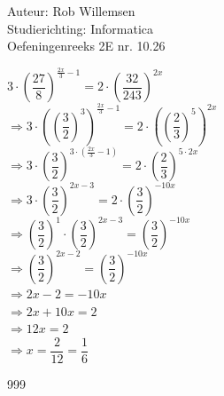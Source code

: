 \documentclass[a4paper]{article}
\begin{document}
\noindent \large Auteur: Rob Willemsen \\
\noindent \large Studierichting: Informatica\\
\noindent \large Oefeningenreeks 2E nr. 10.26\\

\medskip

\normalsize

$3 \cdot \left(\dfrac{27}{8}\right)^{\tfrac{2x}{3}-1} = 2 \cdot \left(\dfrac{32}{243}\right)^{2x}$ \\

$\Rightarrow 3 \cdot \left(\left(\dfrac{3}{2}\right)^3\right)^{\tfrac{2x}{3}-1} = 2 \cdot \left(\left(\dfrac{2}{3}\right)^5\right)^{2x}$\\

$\Rightarrow 3 \cdot \left(\dfrac{3}{2}\right)^{3 \cdot \left(\tfrac{2x}{3}-1\right)} = 2 \cdot \left(\dfrac{2}{3}\right)^{5 \cdot 2x}$\\

$\Rightarrow 3 \cdot \left(\dfrac{3}{2}\right)^{2x-3} = 2 \cdot \left(\dfrac{3}{2}\right)^{-10x}$\\

$\Rightarrow \left(\dfrac{3}{2}\right)^1 \cdot \left(\dfrac{3}{2}\right)^{2x-3} = \left(\dfrac{3}{2}\right)^{-10x}$\\

$\Rightarrow \left(\dfrac{3}{2}\right)^{2x-2} = \left(\dfrac{3}{2}\right)^{-10x}$\\

$\Rightarrow 2x - 2 = -10x$\\

$\Rightarrow 2x + 10x = 2$\\

$\Rightarrow 12x = 2$\\

$\Rightarrow x = \dfrac{2}{12} = \dfrac{1}{6}$\\

\begin{thebibliography}{999}
\end{thebibliography}
\end{document}
